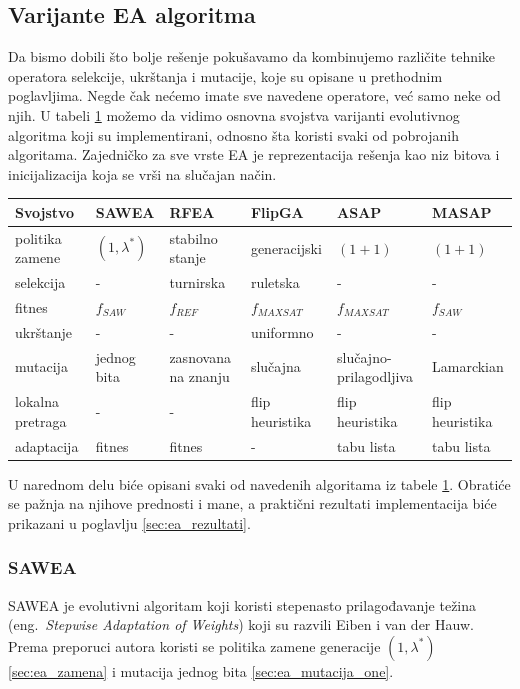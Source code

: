 \documentclass[a4paper]{article}
\begin{document}
\subsection{Varijante EA algoritma}
\label{sec:ea_varijante}
Da bismo dobili što bolje rešenje pokušavamo da kombinujemo različite tehnike 
operatora selekcije, ukrštanja i mutacije, koje su opisane u prethodnim poglavljima. 
Negde čak nećemo imate sve navedene operatore, već samo neke od njih. 
U tabeli \ref{tab:EA} možemo da vidimo osnovna svojstva varijanti evolutivnog algoritma 
koji su implementirani, odnosno šta koristi svaki od pobrojanih algoritama.
Zajedničko za sve vrste EA je reprezentacija rešenja kao niz bitova i
inicijalizacija koja se vrši na slučajan način.
 
\begin{table}[h!]
\centering
{}\label{tab:EA} 
\begin{tabular}{ |p{2cm}|p{2cm}|p{2cm}|p{2cm}|p{2cm}|p{2cm}|}
 \hline
 Svojstvo & SAWEA & RFEA & FlipGA & ASAP & MASAP \\
 \hline
 politika zamene & $(1, \lambda^*)$ & stabilno \break stanje & generacijski & $(1 + 1)$
 & $(1 + 1)$ \\
 selekcija & - & turnirska & ruletska & - & - \\
 fitnes &	$f_{SAW}$ & $f_{REF}$ & $f_{MAXSAT}$ & $f_{MAXSAT}$ & $f_{SAW}$\\
 ukrštanje & - & - & uniformno & - & - \\
 mutacija & jednog bita & zasnovana na znanju & slučajna & slučajno-prilagodljiva 
 & Lamarckian \\
 lokalna \break pretraga & - & - & flip \break heuristika & flip \break heuristika &
 flip \break heuristika \\
 adaptacija & fitnes & fitnes &  - & tabu lista & tabu lista \\
 \hline
\end{tabular}
\end{table}


U narednom delu biće opisani svaki od navedenih algoritama iz tabele \ref{tab:EA}.
Obratiće se pažnja na njihove prednosti i mane, a praktični rezultati implementacija
biće prikazani u poglavlju \ref{sec:ea_rezultati}.


\subsubsection{SAWEA}
\label{sec:ea_sawea}
SAWEA je evolutivni algoritam koji koristi stepenasto prilagođavanje težina 
(eng.~{\em Stepwise Adaptation of Weights}) \cite{ea_with_table, ea_without_table} 
koji su razvili Eiben i van der Hauw. 
Prema preporuci autora koristi se politika zamene generacije $(1,\lambda^*)$
 \ref{sec:ea_zamena} i mutacija jednog bita \ref{sec:ea_mutacija_one}. \\
\end{document}
